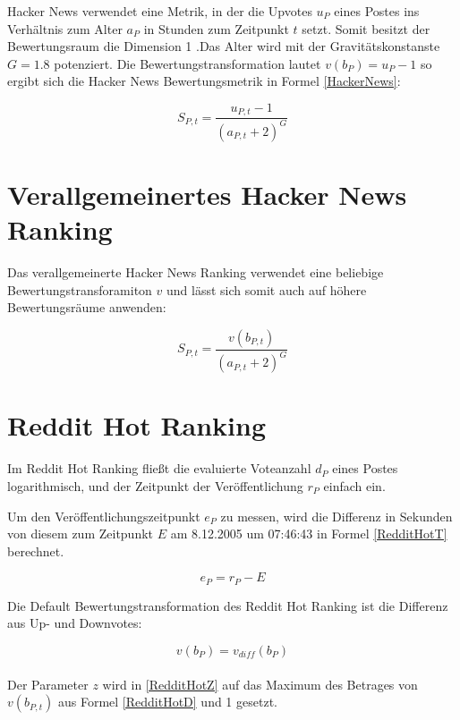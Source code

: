 Hacker News verwendet eine Metrik, in der die Upvotes $u_{P}$ eines Postes ins Verhältnis zum Alter $a_{P}$ in Stunden zum Zeitpunkt $t$ setzt. Somit besitzt der Bewertungsraum die Dimension 1 .Das Alter wird mit der Gravitätskonstanste $G = 1.8$ potenziert. Die Bewertungstransformation lautet $v(b_P) = u_P - 1$ so ergibt sich die Hacker News Bewertungsmetrik in Formel \ref{HackerNews}:
 
\begin{equation}
\label{HackerNews}
S_{P,t} = \frac{u_{P,t} - 1}{(a_{P,t} + 2)^{G}}
\end{equation}

\section{Verallgemeinertes Hacker News Ranking}
\label{seqvHackerNews}
Das verallgemeinerte Hacker News Ranking verwendet eine beliebige Bewertungstransforamiton $v$ und lässt sich somit auch auf höhere Bewertungsräume anwenden:

\begin{equation}
\label{vHackerNews}
S_{P,t} = \frac{v(b_{P,t})}{(a_{P,t} + 2)^{G}}
\end{equation}


\section{Reddit Hot Ranking}


Im Reddit Hot Ranking fließt die evaluierte Voteanzahl $d_P$ eines Postes logarithmisch, und der Zeitpunkt der Veröffentlichung $r_P$ einfach ein. 

Um den Veröffentlichungszeitpunkt $e_P$ zu messen, wird die Differenz in Sekunden von diesem zum Zeitpunkt $E$ am 8.12.2005 um 07:46:43 in Formel \ref{RedditHotT} berechnet.

\begin{equation}
\label{RedditHotT}
e_{P} = r_{P} - E  
\end{equation}

Die Default Bewertungstransformation des Reddit Hot Ranking ist die Differenz aus Up- und Downvotes:

\begin{equation}
\label{RedditHotD}
v(b_{P}) = v_{diff}(b_{P})
\end{equation}
\\
Der Parameter $z$ wird in \ref{RedditHotZ} auf das Maximum des Betrages von $v(b_{P,t})$ aus Formel \ref{RedditHotD} und 1 gesetzt.

